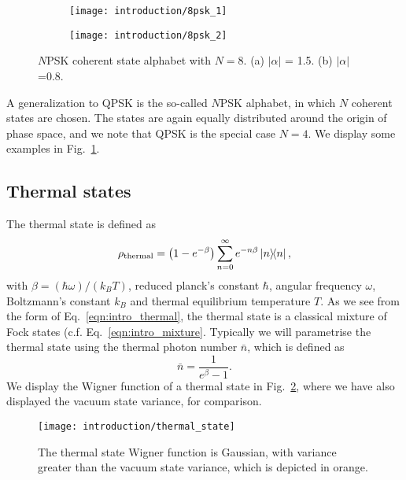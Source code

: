 \begin{figure}[htp]
\captionsetup{width=0.8\linewidth}
\centering
\begin{subfigure}[b]{0.49\linewidth}
\texttt{[image: introduction/8psk\_1]}
\caption{}
\end{subfigure}
\begin{subfigure}[b]{0.49\linewidth}
\texttt{[image: introduction/8psk\_2]}
\caption{}
\end{subfigure}
\caption{\label{fig:intro_npsk} $N$PSK coherent state alphabet with $N=8$. (a) $\left|\alpha\right|$ = 1.5. (b) $\left|\alpha\right|$=0.8.}
\end{figure}

A generalization to QPSK is the so-called $N$PSK alphabet, in which $N$ coherent states are chosen. The states are again equally distributed around the origin of phase space, and we note that QPSK is the special case $N=4$. We display some examples in Fig.~\ref{fig:intro_npsk}.



\FloatBarrier
\subsection{Thermal states}\label{sec:intro_thermal}

The thermal state is defined as
\begin{equation}\label{eqn:intro_thermal}
\rho_{\text{thermal}} = \left( 1 - e^{-\beta} \right) \sum_{n=0}^\infty e^{- n \beta} \dyad{n},
\end{equation}
with $\beta = \left( \hbar \omega \right)/\left(k_B T\right)$, reduced planck's constant $\hbar$, angular frequency $\omega$, Boltzmann's constant $k_B$ and thermal equilibrium temperature $T$. As we see from the form of Eq.~\ref{eqn:intro_thermal}, the thermal state is a classical mixture of Fock states (c.f. Eq.~\ref{eqn:intro_mixture}. Typically we will parametrise the thermal state using the thermal photon number $\bar{n}$, which is defined as 
\begin{equation}
\bar{n} = \frac{1}{e^\beta - 1}.
\end{equation}
We display the Wigner function of a thermal state in Fig.~\ref{fig:thermal_state}, where we have also displayed the vacuum state variance, for comparison.


\begin{figure}[htp]
\captionsetup{width=0.8\linewidth}
\centering
\texttt{[image: introduction/thermal\_state]}
\caption{\label{fig:thermal_state} The thermal state Wigner function is Gaussian, with variance greater than the vacuum state variance, which is depicted in orange.}
\end{figure}

